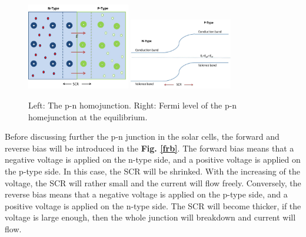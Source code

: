 \documentclass[a4paper, 12pt, titlepage,oneside,drop]{kthesis}
\begin{document}
\begin{figure}[H]
    \begin{center}
            \includegraphics[width=0.4\textwidth,clip]{pnjunction.jpg}
            \includegraphics[width=0.4\textwidth,clip]{pnjunction1.jpg}
     \end{center}
    \caption{Left: The p-n homojunction. Right: Fermi level of the p-n homejunction at the equilibrium. }      
    \label{pnjunction}
\end{figure}




Before discussing further the p-n junction in the solar cells, the forward and reverse bias will be introduced in the \textbf{Fig. \ref{frb}}. The forward bias means that a negative voltage is applied on the n-type side, and a positive voltage is applied 
on the p-type side. In this case, the SCR will be shrinked. With the increasing of the voltage, the SCR will rather small and the current will flow freely. Conversely, the reverse bias means that a negative voltage is applied on the p-type
side, and a positive voltage is applied on the n-type side. The SCR will become thicker, if the voltage is large enough,  then the whole junction will breakdown and current will flow.
\end{document}
